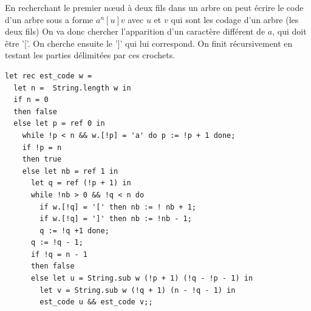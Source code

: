 \newpage
\begin{Exercise}
En recherchant le premier n{\oe}ud à deux fils dans un arbre on peut écrire le code d'un arbre sous a forme $a^n[u]v$ avec $u$ et $v$ qui sont les codage d'un arbre (les deux fils) On va donc chercher l'apparition d'un caractère différent de $a$, qui doit être '['. On cherche ensuite le ']' qui lui correspond. On finit récursivement en testant les parties délimitées par ces crochets.
\begin{lstlisting}
let rec est_code w =
  let n =  String.length w in
  if n = 0
  then false
  else let p = ref 0 in
    while !p < n && w.[!p] = 'a' do p := !p + 1 done;
    if !p = n
    then true
    else let nb = ref 1 in
      let q = ref (!p + 1) in
      while !nb > 0 && !q < n do
        if w.[!q] = '[' then nb := ! nb + 1;
        if w.[!q] = ']' then nb := !nb - 1;
        q := !q +1 done;
      q := !q - 1;
      if !q = n - 1
      then false
      else let u = String.sub w (!p + 1) (!q - !p - 1) in
        let v = String.sub w (!q + 1) (n - !q - 1) in
        est_code u && est_code v;;
  \end{lstlisting}
\end{Exercise}

